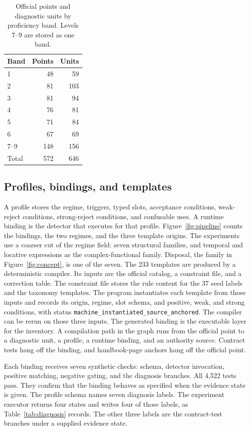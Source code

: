 \documentclass[pdflatex,sn-mathphys,NameDate]{sn-jnl}
\begin{document}
\begin{table}[!ht]
\centering
\small
\begin{tabular}{lrr}
\toprule
Band & Points & Units \\
\midrule
1 & 48 & 59 \\
2 & 81 & 103 \\
3 & 81 & 94 \\
4 & 76 & 81 \\
5 & 71 & 84 \\
6 & 67 & 69 \\
7--9 & 148 & 156 \\
\midrule
Total & 572 & 646 \\
\bottomrule
\end{tabular}
\caption{Official points and diagnostic units by proficiency band. Levels 7--9 are stored as one band.}
\label{tab:bands}
\end{table}

\subsection{Profiles, bindings, and templates}

A profile stores the regime, triggers, typed slots, acceptance conditions, weak-reject conditions, strong-reject conditions, and confusable uses.
A runtime binding is the detector that executes for that profile.
Figure~\ref{fig:pipeline} counts the bindings, the two regimes, and the three template origins.
The experiments use a coarser cut of the regime field: seven structural families, and temporal and locative expressions as the complex-functional family.
Disposal, the family in Figure~\ref{fig:concept}, is one of the seven.
The 233 templates are produced by a deterministic compiler.
Its inputs are the official catalog, a constraint file, and a correction table.
The constraint file stores the rule content for the 37 seed labels and the taxonomy templates.
The program instantiates each template from those inputs and records its origin, regime, slot schema, and positive, weak, and strong conditions, with status \texttt{machine\_instantiated\_source\_anchored}.
The compiler can be rerun on those three inputs.
The generated binding is the executable layer for the inventory.
A compilation path in the graph runs from the official point to a diagnostic unit, a profile, a runtime binding, and an authority source.
Contract tests hang off the binding, and handbook-page anchors hang off the official point.

Each binding receives seven synthetic checks: schema, detector invocation, positive matching, negative gating, and the diagnosis branches.
All 4,522 tests pass.
They confirm that the binding behaves as specified when the evidence state is given.
The profile schema names seven diagnosis labels.
The experiment executor returns four states and writes four of those labels, as Table~\ref{tab:diagnosis} records.
The other three labels are the contract-test branches under a supplied evidence state.
\end{document}
